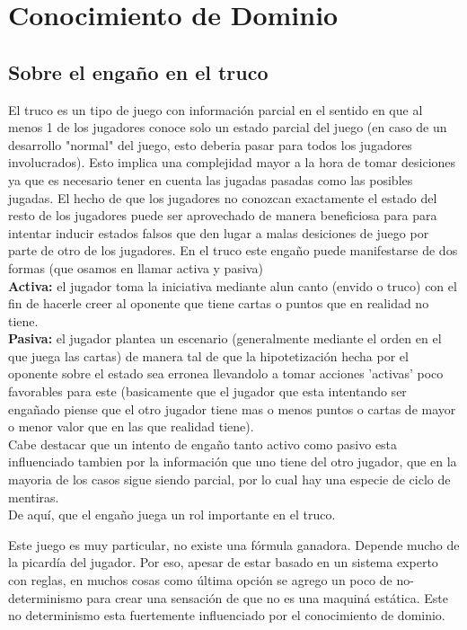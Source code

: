 \documentclass[12pt,a4paper]{article}
\begin{document}
\section{Conocimiento de Dominio}

\subsection*{Sobre el enga\~no en el truco}

El truco es un tipo de juego con informaci\'on parcial en el sentido en que al menos 1 de los jugadores
conoce solo un estado parcial del juego (en caso de un desarrollo "normal" del juego, esto deberia 
pasar para todos los jugadores involucrados). Esto implica una complejidad mayor a la hora de tomar desiciones
ya que es necesario tener en cuenta las jugadas pasadas como las posibles jugadas. 
El hecho de que los jugadores no conozcan exactamente el estado del resto de los jugadores puede ser aprovechado
de manera beneficiosa para para intentar inducir estados falsos que den lugar a malas desiciones de juego 
por parte de otro de los jugadores. En el truco este enga\~no puede manifestarse de dos formas (que osamos en llamar
activa y pasiva)\\
\textbf{Activa:} el jugador toma la iniciativa mediante alun canto (envido o truco) con el fin de hacerle creer al oponente que tiene
cartas o puntos que en realidad no tiene.\\
\textbf{Pasiva:} el jugador plantea un escenario (generalmente mediante el orden en el que juega las cartas) de manera tal de que 
la hipotetizaci\'on hecha por el oponente sobre el estado sea erronea llevandolo a tomar acciones 'activas' poco favorables para 
este (basicamente que el jugador que esta intentando ser enga\~nado piense que el otro jugador tiene mas o menos puntos o cartas de 
mayor o menor valor que en las que realidad tiene).\\
Cabe destacar que un intento de enga\~no tanto activo como pasivo esta influenciado tambien por la informaci\'on que uno tiene del otro jugador,
que en la mayoria de los casos sigue siendo parcial,  por lo cual hay una especie de ciclo de mentiras.\\
De aqu\'i, que el enga\~no juega un rol importante en el truco.


Este juego es muy particular, no existe una f\'ormula ganadora. Depende mucho de la picard\'ia del jugador. Por eso, apesar de estar basado en un sistema experto
con reglas, en muchos cosas como \'ultima opci\'on se agrego un poco de no-determinismo para crear una sensaci\'on  de que no es una maquin\'a est\'atica. 
Este no determinismo esta fuertemente influenciado por el conocimiento de dominio.
\end{document}
